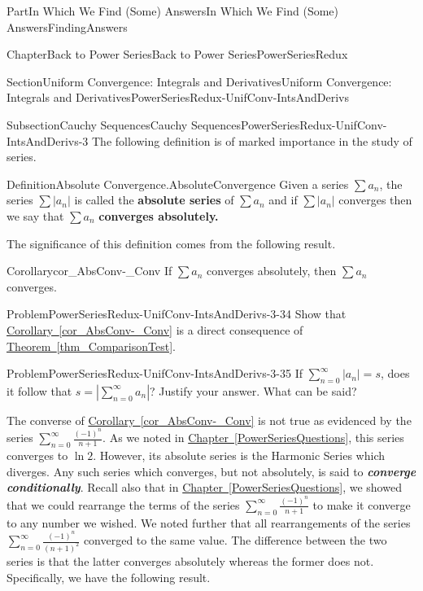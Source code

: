 \documentclass[oneside,10pt,]{book}
\newcommand{\xreffont}{\relax}
\newcommand{\alert}[1]{\textbf{\textit{#1}}}
\newcommand{\terminology}[1]{\textbf{#1}}
\numberwithin{equation}{part}
\newcommand{\abs}[1]{\left|#1\right|}
\begin{document}
\begin{partptx}{Part}{In Which We Find (Some) Answers}{}{In Which We Find (Some) Answers}{}{}{FindingAnswers}
\begin{chapterptx}{Chapter}{Back to Power Series}{}{Back to Power Series}{}{}{PowerSeriesRedux}
\begin{sectionptx}{Section}{Uniform Convergence: Integrals and Derivatives}{}{Uniform Convergence: Integrals and Derivatives}{}{}{PowerSeriesRedux-UnifConv-IntsAndDerivs}
\begin{subsectionptx}{Subsection}{Cauchy Sequences}{}{Cauchy Sequences}{}{}{PowerSeriesRedux-UnifConv-IntsAndDerivs-3}
The following definition is of marked importance in the study of series.%
\begin{definition}{Definition}{Absolute Convergence.}{AbsoluteConvergence}%
%
%
%
Given a series \(\sum a_n\), the series \(\sum|a_n|\) is called the \terminology{absolute series} of \(\sum a_{n}\) and if \(\sum|a_n|\) converges then we say that \(\sum a_{n}\) \terminology{converges absolutely.}%
\end{definition}
The significance of this definition comes from the following result.%
\begin{corollary}{Corollary}{}{}{cor_AbsConv-_Conv}%
If \(\sum a_n\) converges absolutely, then \(\sum a_n\) converges.%
\end{corollary}
\begin{problem}{Problem}{}{PowerSeriesRedux-UnifConv-IntsAndDerivs-3-34}%
Show that \hyperref[cor_AbsConv-_Conv]{Corollary~{\xreffont\ref{cor_AbsConv-_Conv}}} is a direct consequence of \hyperref[thm_ComparisonTest]{Theorem~{\xreffont\ref{thm_ComparisonTest}}}.%
\end{problem}
\begin{problem}{Problem}{}{PowerSeriesRedux-UnifConv-IntsAndDerivs-3-35}%
If \(\displaystyle\sum_{n=0}^\infty\abs{a_n}=s\),  does it follow that \(\displaystyle s= \abs{\sum_{n=0}^\infty a_n}\)?  Justify your answer.  What can be said?%
\end{problem}
 The converse of \hyperref[cor_AbsConv-_Conv]{Corollary~{\xreffont\ref{cor_AbsConv-_Conv}}} is not true as evidenced by the series \(\displaystyle\sum_{n=0}^\infty\frac{(-1)^n}{n+1}\).  As we noted in \hyperref[PowerSeriesQuestions]{Chapter~{\xreffont\ref{PowerSeriesQuestions}}}, this series converges to \(\ln 2\).  However, its absolute series is the Harmonic  Series which diverges.  Any such series which converges, but not absolutely, is said to \alert{converge conditionally}. Recall also that in \hyperref[PowerSeriesQuestions]{Chapter~{\xreffont\ref{PowerSeriesQuestions}}}, we showed that we could rearrange the terms of the series \(\displaystyle\sum_{n=0}^\infty\frac{(-1)^n}{n+1}\) to make it converge to any number we wished.  We noted further that all rearrangements of the series \(\displaystyle\sum_{n=0}^\infty\frac{(-1)^n}{\left(n+1\right)^2}\) converged to the same value.  The difference between the two series is that the latter converges absolutely whereas the former does not.  Specifically, we have the following result.%

\end{subsectionptx}
\end{sectionptx}
\end{chapterptx}
\end{partptx}
\end{document}
